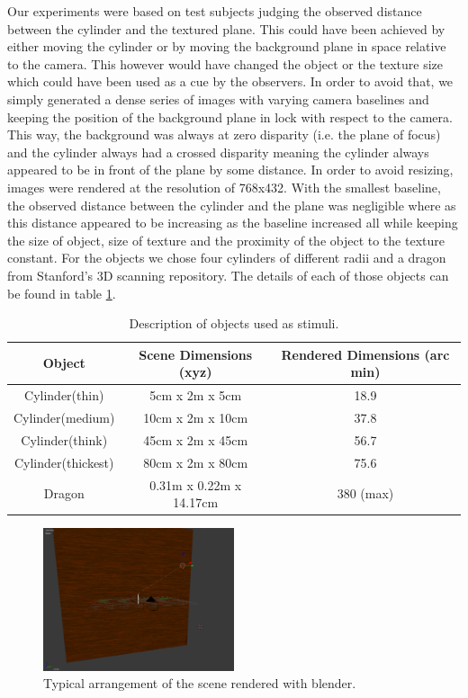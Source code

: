 Our experiments were based on test subjects judging the observed distance between the cylinder and the textured plane. This could have been achieved by either moving the cylinder or by moving the background plane in space relative to the camera. This however would have changed the object or the texture size which could have been used as a cue by the observers. In order to avoid that, we simply generated a dense series of images with varying camera baselines and keeping the position of the background plane in lock with respect to the camera. This way, the background was always at zero disparity (i.e. the plane of focus) and the cylinder always had a crossed disparity meaning the cylinder always appeared to be in front of the plane by some distance. In order to avoid resizing, images were rendered at the resolution of 768x432. With the smallest baseline, the observed distance between the cylinder and the plane was negligible where as this distance appeared to be increasing as the baseline increased all while keeping the size of object, size of texture and the proximity of the object to the texture constant. For the objects we chose four cylinders of different radii and a dragon from Stanford's 3D scanning repository. The details of each of those objects can be found in table \ref{tab:stimili_desc}.
\begin{table}[h!]
  \begin{center}
    \caption{Description of objects used as stimuli.}
    \label{tab:stimili_desc}
    \begin{tabular}{ccc}
      \toprule
      Object & Scene Dimensions (xyz) & Rendered Dimensions (arc min)\\
      \midrule
      Cylinder(thin) & 5cm x 2m x 5cm & 18.9\\
      Cylinder(medium) & 10cm x 2m x 10cm & 37.8\\
      Cylinder(think) & 45cm x 2m x 45cm & 56.7\\
      Cylinder(thickest) & 80cm x 2m x 80cm & 75.6 \\
      Dragon & 0.31m x 0.22m x 14.17cm & 380 (max) \\
      \bottomrule
    \end{tabular}
  \end{center}
\end{table}
\begin{figure}
\centering
    \includegraphics[width=0.5\textwidth]{./Template_Figures/blender_scene}
    \caption{Typical arrangement of the scene rendered with blender.\label{fig:blender_scene}}
\end{figure}


